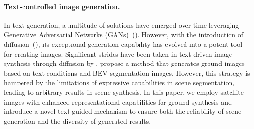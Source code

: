 \paragraph{Text-controlled image generation.} In text generation, a multitude of solutions have emerged over time leveraging Generative Adversarial Networks (GANs)~(\cite{dash2017tac, regmi2018cross, ruan2021dae, tao2022df}). However, with the introduction of diffusion~(\cite{song2020score, rombach2022high}), its exceptional generation capability has evolved into a potent tool for creating images. Signiﬁcant strides have been taken in text-driven image synthesis through diffusion by \cite{avrahami2022blended, li2023gligen, brooks2023instructpix2pix}. \cite{li2023drivingdiffusion, gao2023magicdrive} propose a method that generates ground images based on text conditions and BEV segmentation images. However, this strategy is hampered by the limitations of expressive capabilities in scene segmentation, leading to arbitrary results in scene synthesis. In this paper, we employ satellite images with enhanced representational capabilities for ground synthesis and introduce a novel text-guided mechanism to ensure both the reliability of scene generation and the diversity of generated results.